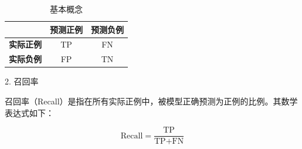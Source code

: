 \begin{table}[h!]
	\centering
	\caption{基本概念}
	\label{tab:confusion_matrix}
	\begin{tabular}{l c c}
		\toprule
		& \textbf{预测正例} & \textbf{预测负例} \\
		\midrule
		\textbf{实际正例} & TP & FN \\
		\textbf{实际负例} & FP & TN \\
		\bottomrule
	\end{tabular}
\end{table}

2. 召回率

召回率（Recall）是指在所有实际正例中，被模型正确预测为正例的比例。其数学表达式如下：

\[
\text{Recall} = \frac{\text{TP}}{\text{TP} + \text{FN}}
\]




